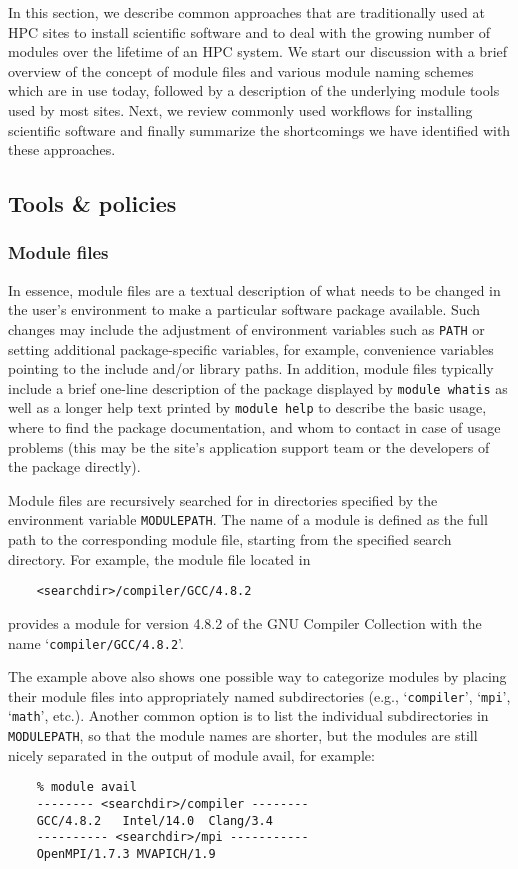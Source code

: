 In this section, we describe common approaches that are traditionally used at
HPC sites to install scientific software and to deal with the growing number
of modules over the lifetime of an HPC system. We start our discussion with a
brief overview of the concept of module files and various module naming
schemes which are in use today, followed by a description of the underlying
module tools used by most sites. Next, we review commonly used workflows for
installing scientific software and finally summarize the shortcomings we have
identified with these approaches.

\subsection{Tools \& policies}

\subsubsection{Module files}
\label{sec:Module_files}

In essence, module files are a textual description of what needs to be
changed in the user's environment to make a particular software package
available. Such changes may include the adjustment of environment variables
such as \texttt{PATH} or setting additional package-specific variables, for
example, convenience variables pointing to the include and/or library paths.
In addition, module files typically include a brief one-line description of
the package displayed by \texttt{module whatis} as well as a longer help text
printed by \texttt{module help} to describe the basic usage, where to find
the package documentation, and whom to contact in case of usage problems
(this may be the site's application support team or the developers of the
package directly).

Module files are recursively searched for in directories specified by the
environment variable \texttt{MODULEPATH}. The name of a module is defined
as the full path to the corresponding module file, starting from the
specified search directory. For example, the module file located in
\begin{verbatim}
    <searchdir>/compiler/GCC/4.8.2
\end{verbatim}
provides a module for version 4.8.2 of the GNU Compiler Collection with the
name `\texttt{compiler/GCC/4.8.2}'.

The example above also shows one possible way to categorize modules by
placing their module files into appropriately named subdirectories (e.g.,
`\texttt{compiler}', `\texttt{mpi}', `\texttt{math}', etc.). Another common
option is to list the individual subdirectories in \texttt{MODULEPATH}, so
that the module names are shorter, but the modules are still nicely separated
in the output of module avail, for example:
\begin{verbatim}
    % module avail
    -------- <searchdir>/compiler --------
    GCC/4.8.2   Intel/14.0  Clang/3.4
    ---------- <searchdir>/mpi -----------
    OpenMPI/1.7.3 MVAPICH/1.9
\end{verbatim}

